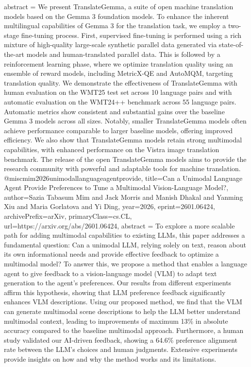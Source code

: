 {      abstract = {We present TranslateGemma, a suite of open machine translation models based on the Gemma 3 foundation models. To enhance the inherent multilingual capabilities of Gemma 3 for the translation task, we employ a two-stage fine-tuning process. First, supervised fine-tuning is performed using a rich mixture of high-quality large-scale synthetic parallel data generated via state-of-the-art models and human-translated parallel data. This is followed by a reinforcement learning phase, where we optimize translation quality using an ensemble of reward models, including MetricX-QE and AutoMQM, targeting translation quality. We demonstrate the effectiveness of TranslateGemma with human evaluation on the WMT25 test set across 10 language pairs and with automatic evaluation on the WMT24++ benchmark across 55 language pairs. Automatic metrics show consistent and substantial gains over the baseline Gemma 3 models across all sizes. Notably, smaller TranslateGemma models often achieve performance comparable to larger baseline models, offering improved efficiency. We also show that TranslateGemma models retain strong multimodal capabilities, with enhanced performance on the Vistra image translation benchmark. The release of the open TranslateGemma models aims to provide the research community with powerful and adaptable tools for machine translation.}
}@misc{mim2026unimodallanguageagentprovide,
      title={Can a Unimodal Language Agent Provide Preferences to Tune a Multimodal Vision-Language Model?}, 
      author={Sazia Tabasum Mim and Jack Morris and Manish Dhakal and Yanming Xiu and Maria Gorlatova and Yi Ding},
      year={2026},
      eprint={2601.06424},
      archivePrefix={arXiv},
      primaryClass={cs.CL},
      url={https://arxiv.org/abs/2601.06424},
      abstract = {To explore a more scalable path for adding multimodal capabilities to existing LLMs, this paper addresses a fundamental question: Can a unimodal LLM, relying solely on text, reason about its own informational needs and provide effective feedback to optimize a multimodal model? To answer this, we propose a method that enables a language agent to give feedback to a vision-language model (VLM) to adapt text generation to the agent's preferences. Our results from different experiments affirm this hypothesis, showing that LLM preference feedback significantly enhances VLM descriptions. Using our proposed method, we find that the VLM can generate multimodal scene descriptions to help the LLM better understand multimodal context, leading to improvements of maximum 13\% in absolute accuracy compared to the baseline multimodal approach. Furthermore, a human study validated our AI-driven feedback, showing a 64.6\% preference alignment rate between the LLM's choices and human judgments. Extensive experiments provide insights on how and why the method works and its limitations.}
}
